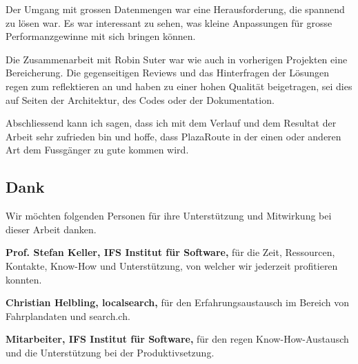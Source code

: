 Der Umgang mit grossen Datenmengen war eine Herausforderung, die spannend zu lösen war. Es war interessant zu sehen, was kleine Anpassungen für grosse Performanzgewinne mit sich bringen können.

Die Zusammenarbeit mit Robin Suter war wie auch in vorherigen Projekten eine Bereicherung. Die gegenseitigen Reviews und das Hinterfragen der Lösungen regen zum reflektieren an und haben zu einer hohen Qualität beigetragen, sei dies auf Seiten der Architektur, des Codes oder der Dokumentation.

Abschliessend kann ich sagen, dass ich mit dem Verlauf und dem Resultat der Arbeit sehr zufrieden bin und hoffe, dass PlazaRoute in der einen oder anderen Art dem Fussgänger zu gute kommen wird.


\subsection{Dank}
\label{sub:Dank}

Wir möchten folgenden Personen für ihre Unterstützung und Mitwirkung bei dieser Arbeit danken.

\textbf{Prof. Stefan Keller, IFS Institut für Software,} für die Zeit, Ressourcen, Kontakte, Know-How und Unterstützung, von welcher wir jederzeit profitieren konnten.

\textbf{Christian Helbling, localsearch,} für den Erfahrungsaustausch im Bereich von Fahrplandaten und search.ch.

\textbf{Mitarbeiter, IFS Institut für Software,} für den regen Know-How-Austausch und die Unterstützung bei der Produktivsetzung.
